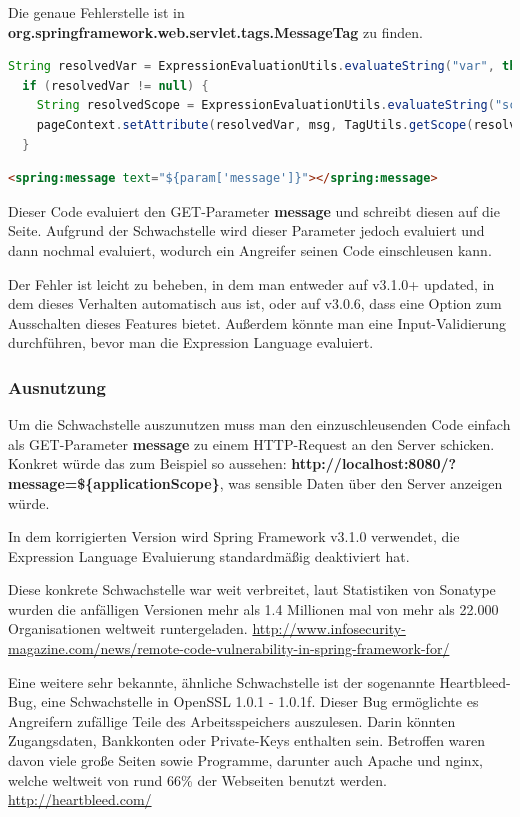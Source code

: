 \documentclass[12pt,a4paper,titlepage,oneside]{scrartcl}
\begin{document}
Die genaue Fehlerstelle ist in \textbf{org.springframework.web.servlet.tags.MessageTag} zu finden.
\begin{lstlisting}[caption=Java,language=Java]
String resolvedVar = ExpressionEvaluationUtils.evaluateString("var", this.var, pageContext);
  if (resolvedVar != null) {
    String resolvedScope = ExpressionEvaluationUtils.evaluateString("scope", this.scope, pageContext);
    pageContext.setAttribute(resolvedVar, msg, TagUtils.getScope(resolvedScope));
  }
\end{lstlisting}
\begin{lstlisting}[caption=HTML,language=HTML]
<spring:message text="${param['message']}"></spring:message>
\end{lstlisting}
Dieser Code evaluiert den GET-Parameter \textbf{message} und schreibt diesen auf die Seite. Aufgrund der Schwachstelle wird dieser Parameter jedoch evaluiert und dann nochmal evaluiert, wodurch ein Angreifer seinen Code einschleusen kann.

Der Fehler ist leicht zu beheben, in dem man entweder auf v3.1.0+ updated, in dem dieses Verhalten automatisch aus ist, oder auf v3.0.6, dass eine Option zum Ausschalten dieses Features bietet. Außerdem könnte man eine Input-Validierung durchführen, bevor man die Expression Language evaluiert.

\subsubsection{Ausnutzung}
Um die Schwachstelle auszunutzen muss man den einzuschleusenden Code einfach als GET-Parameter \textbf{message} zu einem HTTP-Request an den Server schicken. Konkret würde das zum Beispiel so aussehen: \textbf{http://localhost:8080/?message=\$\{applicationScope\}}, was sensible Daten über den Server anzeigen würde.

In dem korrigierten Version wird Spring Framework v3.1.0 verwendet, die Expression Language Evaluierung standardmäßig deaktiviert hat.

Diese konkrete Schwachstelle war weit verbreitet, laut Statistiken von Sonatype wurden die anfälligen Versionen mehr als 1.4 Millionen mal von mehr als 22.000 Organisationen weltweit runtergeladen. \url{http://www.infosecurity-magazine.com/news/remote-code-vulnerability-in-spring-framework-for/}

Eine weitere sehr bekannte, ähnliche Schwachstelle ist der sogenannte Heartbleed-Bug, eine Schwachstelle in OpenSSL 1.0.1 - 1.0.1f. Dieser Bug ermöglichte es Angreifern zufällige Teile des Arbeitsspeichers auszulesen. Darin könnten Zugangsdaten, Bankkonten oder Private-Keys enthalten sein. Betroffen waren davon viele große Seiten sowie Programme, darunter auch Apache und nginx, welche weltweit von rund 66\% der Webseiten benutzt werden. \url{http://heartbleed.com/}
\end{document}
